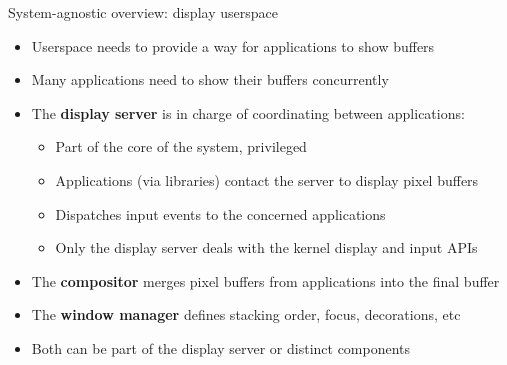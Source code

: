\begin{frame}{System-agnostic overview: display userspace}
  \begin{itemize}
  \item Userspace needs to provide a way for applications to show buffers
  \item Many applications need to show their buffers concurrently
  \item The \textbf{display server} is in charge of coordinating between applications:
    \begin{itemize}
    \item Part of the core of the system, privileged
    \item Applications (via libraries) contact the server to display pixel buffers
    \item Dispatches input events to the concerned applications
    \item Only the display server deals with the kernel display and input APIs
    \end{itemize}
  \item The \textbf{compositor} merges pixel buffers from applications into the final buffer
  \item The \textbf{window manager} defines stacking order, focus, decorations, etc
  \item Both can be part of the display server or distinct components
  \end{itemize}
\end{frame}

